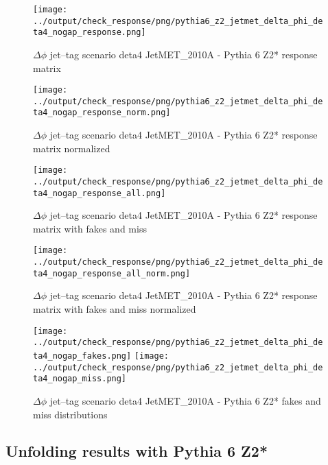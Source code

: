 \documentclass[11pt]{book}
\begin{document}
\begin{figure}[ht]
\centering
\texttt{[image: ../output/check\_response/png/pythia6\_z2\_jetmet\_delta\_phi\_deta4\_nogap\_response.png]}
\caption{$\Delta\phi$ jet--tag scenario deta4 JetMET\_2010A - Pythia 6 Z2* response matrix}
\label{p6_jetmet_delta_phi_deta4_nogap_response}
\end{figure}

\begin{figure}[ht]
\centering
\texttt{[image: ../output/check\_response/png/pythia6\_z2\_jetmet\_delta\_phi\_deta4\_nogap\_response\_norm.png]}
\caption{$\Delta\phi$ jet--tag scenario deta4 JetMET\_2010A - Pythia 6 Z2* response matrix normalized}
\label{p6_jetmet_delta_phi_deta4_nogap_response_norm}
\end{figure}

\begin{figure}[ht]
\centering
\texttt{[image: ../output/check\_response/png/pythia6\_z2\_jetmet\_delta\_phi\_deta4\_nogap\_response\_all.png]}
\caption{$\Delta\phi$ jet--tag scenario deta4 JetMET\_2010A - Pythia 6 Z2* response matrix with fakes and miss}
\label{p6_jetmet_delta_phi_deta4_nogap_response_all}
\end{figure}

\begin{figure}[ht]
\centering
\texttt{[image: ../output/check\_response/png/pythia6\_z2\_jetmet\_delta\_phi\_deta4\_nogap\_response\_all\_norm.png]}
\caption{$\Delta\phi$ jet--tag scenario deta4 JetMET\_2010A - Pythia 6 Z2* response matrix with fakes and miss normalized}
\label{p6_jetmet_delta_phi_deta4_nogap_response_all_norm}
\end{figure}

\begin{figure}[ht]
\centering
\texttt{[image: ../output/check\_response/png/pythia6\_z2\_jetmet\_delta\_phi\_deta4\_nogap\_fakes.png]}
\texttt{[image: ../output/check\_response/png/pythia6\_z2\_jetmet\_delta\_phi\_deta4\_nogap\_miss.png]}
\caption{$\Delta\phi$ jet--tag scenario deta4 JetMET\_2010A - Pythia 6 Z2* fakes and miss distributions}
\label{p6_jetmet_delta_phi_deta4_nogap_fakesmiss}
\end{figure}


\clearpage
\subsection{Unfolding results with Pythia 6 Z2*}
\end{document}
